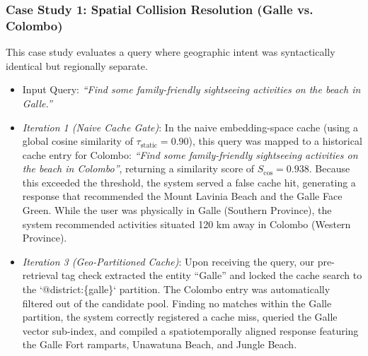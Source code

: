 \documentclass{ieeeaccess}
\begin{document}
\subsubsection{Case Study 1: Spatial Collision Resolution (Galle vs. Colombo)}
This case study evaluates a query where geographic intent was syntactically identical but regionally separate.
\begin{itemize}
    \item {Input Query}: \emph{``Find some family-friendly sightseeing activities on the beach in Galle.''}
    \item \emph{Iteration 1 (Naive Cache Gate)}: In the naive embedding-space cache (using a global cosine similarity of $\tau_{\text{static}} = 0.90$), this query was mapped to a historical cache entry for Colombo: \emph{``Find some family-friendly sightseeing activities on the beach in Colombo''}, returning a similarity score of $S_{\text{cos}} = 0.938$. Because this exceeded the threshold, the system served a false cache hit, generating a response that recommended the Mount Lavinia Beach and the Galle Face Green. While the user was physically in Galle (Southern Province), the system recommended activities situated 120 km away in Colombo (Western Province).
    \item \emph{Iteration 3 (Geo-Partitioned Cache)}: Upon receiving the query, our pre-retrieval tag check extracted the entity ``Galle'' and locked the cache search to the `@district:\{galle\}` partition. The Colombo entry was automatically filtered out of the candidate pool. Finding no matches within the Galle partition, the system correctly registered a cache miss, queried the Galle vector sub-index, and compiled a spatiotemporally aligned response featuring the Galle Fort ramparts, Unawatuna Beach, and Jungle Beach.
\end{itemize}
\end{document}

